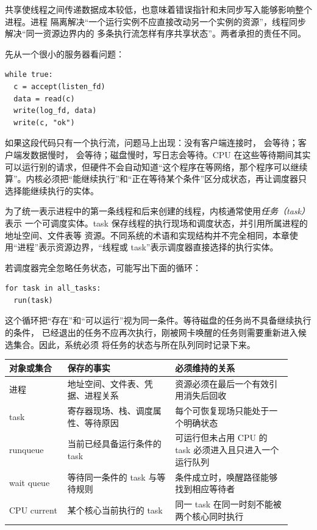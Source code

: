 共享使线程之间传递数据成本较低，也意味着错误指针和未同步写入能够影响整个进程。进程
隔离解决“一个运行实例不应直接改动另一个实例的资源”，线程同步解决“同一资源边界内的
多条执行流怎样有序共享状态”。两者承担的责任不同。

先从一个很小的服务器看问题：

\begin{lstlisting}
while true:
  c = accept(listen_fd)
  data = read(c)
  write(log_fd, data)
  write(c, "ok")
\end{lstlisting}

如果这段代码只有一个执行流，问题马上出现：没有客户端连接时， 会等待；客户端发数据慢时， 会等待；磁盘慢时，写日志会等待。CPU 在这些等待期间其实可以运行别的请求，但硬件不会自动知道“这个程序在等网络，那个程序可以继续算”。内核必须把“能继续执行”和“正在等待某个条件”区分成状态，再让调度器只选择能继续执行的实体。

为了统一表示进程中的第一条线程和后来创建的线程，内核通常使用\emph{任务（task）}表示
一个可调度实体。task 保存线程的执行现场和调度状态，并引用所属进程的地址空间、文件表等
资源。不同系统的术语和实现结构并不完全相同，本章使用“进程”表示资源边界，“线程或
task”表示调度器直接选择的执行实体。

若调度器完全忽略任务状态，可能写出下面的循环：

\begin{lstlisting}
for task in all_tasks:
  run(task)
\end{lstlisting}

这个循环把“存在”和“可以运行”视为同一条件。等待磁盘的任务尚不具备继续执行的条件，
已经退出的任务不应再次执行，刚被网卡唤醒的任务则需要重新进入候选集合。因此，系统必须
将任务的状态与所在队列同时记录下来。

\begin{longtable}{|L{0.19\linewidth}|L{0.35\linewidth}|L{0.38\linewidth}|}
\toprule
对象或集合 & 保存的事实 & 必须维持的关系 \\
\midrule
进程 & 地址空间、文件表、凭据、进程关系 & 资源必须在最后一个有效引用消失后回收 \\\tablerowrule
task & 寄存器现场、栈、调度属性、等待原因 & 每个可恢复现场只能处于一个明确状态 \\\tablerowrule
runqueue & 当前已经具备运行条件的 task & 可运行但未占用 CPU 的 task 必须进入且只进入一个运行队列 \\\tablerowrule
wait queue & 等待同一条件的 task 与等待规则 & 条件成立时，唤醒路径能够找到相应等待者 \\\tablerowrule
CPU current & 某个核心当前执行的 task & 同一 task 在同一时刻不能被两个核心同时执行 \\
\bottomrule
\end{longtable}

